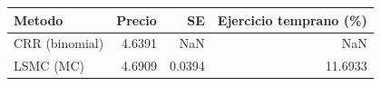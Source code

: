\begin{tabular}{lrrr}
\toprule
Metodo & Precio & SE & Ejercicio temprano (\%) \\
\midrule
CRR (binomial) & 4.6391 & NaN & NaN \\
LSMC (MC) & 4.6909 & 0.0394 & 11.6933 \\
\bottomrule
\end{tabular}
